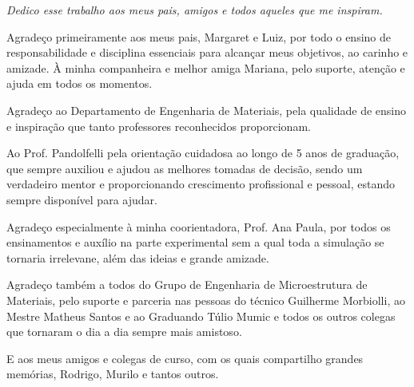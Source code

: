 \documentclass[
	12pt,				%
	openrany,			%
	twoside,			%
	a4paper,			%
	chapter=TITLE,		%
	english,			%
	french,				%
	spanish,			%
	brazil,				%
	hyphens,
  oldfontcommands]{abntex2}
\theoremstyle{definition}
\theoremstyle{definition}
\begin{document}

    
  

\begin{dedicatoria}
   \vspace*{\fill}
   \centering
   \noindent
   \textit{Dedico esse trabalho aos meus pais, amigos e todos aqueles que me inspiram.} \vspace*{\fill}
\end{dedicatoria}

\begin{agradecimentos}

Agradeço primeiramente aos meus pais, Margaret e Luiz, por todo o ensino de
responsabilidade e disciplina essenciais para alcançar meus objetivos, ao
carinho e amizade. À minha companheira e melhor amiga Mariana, pelo suporte,
atenção e ajuda em todos os momentos.

Agradeço ao Departamento de Engenharia de Materiais, pela qualidade de ensino e
inspiração que tanto professores reconhecidos proporcionam.

Ao Prof. Pandolfelli pela orientação cuidadosa ao longo de 5 anos de graduação, que sempre
auxiliou e ajudou as melhores tomadas de decisão, sendo um verdadeiro mentor e proporcionando
crescimento profissional e pessoal, estando sempre disponível para ajudar.

Agradeço especialmente à minha coorientadora, Prof. Ana Paula, por todos os
ensinamentos e auxílio na parte experimental sem a qual toda a simulação se
tornaria irrelevane, além das ideias e grande amizade.

Agradeço também a todos do Grupo de Engenharia de Microestrutura de Materiais,
pelo suporte e parceria nas pessoas do técnico Guilherme Morbiolli, ao Mestre
Matheus Santos e ao Graduando Túlio Mumic e todos os outros colegas que tornaram
o dia a dia sempre mais amistoso. 

E aos meus amigos e colegas de curso, com os quais compartilho grandes memórias,
Rodrigo, Murilo e tantos outros. 

\end{agradecimentos}
\end{document}
